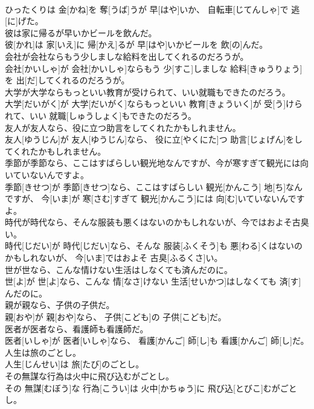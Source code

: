 \documentclass[8pt]{extreport}
\begin{document}
\begin{CJK}{UTF8}{min}
\\	ひったくりは 金[かね]を 奪[うば]うが 早[はや]いか、 自転車[じてんしゃ]で 逃[に]げた。
\\	彼は家に帰るが早いかビールを飲んだ。	
\\	彼[かれ]は 家[いえ]に 帰[かえ]るが 早[はや]いかビールを 飲[の]んだ。
\\	会社が会社ならもう少しましな給料を出してくれるのだろうが。	
\\	会社[かいしゃ]が 会社[かいしゃ]ならもう 少[すこ]しましな 給料[きゅうりょう]を 出[だ]してくれるのだろうが。
\\	大学が大学ならもっといい教育が受けられて、いい就職もできたのだろう。	
\\	大学[だいがく]が 大学[だいがく]ならもっといい 教育[きょういく]が 受[う]けられて、いい 就職[しゅうしょく]もできたのだろう。
\\	友人が友人なら、役に立つ助言をしてくれたかもしれません。	
\\	友人[ゆうじん]が 友人[ゆうじん]なら、 役に立[やくにた]つ 助言[じょげん]をしてくれたかもしれません。
\\	季節が季節なら、ここはすばらしい観光地なんですが、今が寒すぎて観光には向いていないんですよ。	
\\	季節[きせつ]が 季節[きせつ]なら、ここはすばらしい 観光[かんこう] 地[ち]なんですが、 今[いま]が 寒[さむ]すぎて 観光[かんこう]には 向[む]いていないんですよ。
\\	時代が時代なら、そんな服装も悪くはないのかもしれないが、今ではおよそ古臭い。	
\\	時代[じだい]が 時代[じだい]なら、そんな 服装[ふくそう]も 悪[わる]くはないのかもしれないが、 今[いま]ではおよそ 古臭[ふるくさ]い。
\\	世が世なら、こんな情けない生活はしなくても済んだのに。	
\\	世[よ]が 世[よ]なら、こんな 情[なさ]けない 生活[せいかつ]はしなくても 済[す]んだのに。
\\	親が親なら、子供の子供だ。	
\\	親[おや]が 親[おや]なら、 子供[こども]の 子供[こども]だ。
\\	医者が医者なら、看護師も看護師だ。	
\\	医者[いしゃ]が 医者[いしゃ]なら、 看護[かんご] 師[し]も 看護[かんご] 師[し]だ。
\\	人生は旅のごとし。	
\\	人生[じんせい]は 旅[たび]のごとし。
\\	その無謀な行為は火中に飛び込むがごとし。	
\\	その 無謀[むぼう]な 行為[こうい]は 火中[かちゅう]に 飛び込[とびこ]むがごとし。

\end{CJK}
\end{document}
